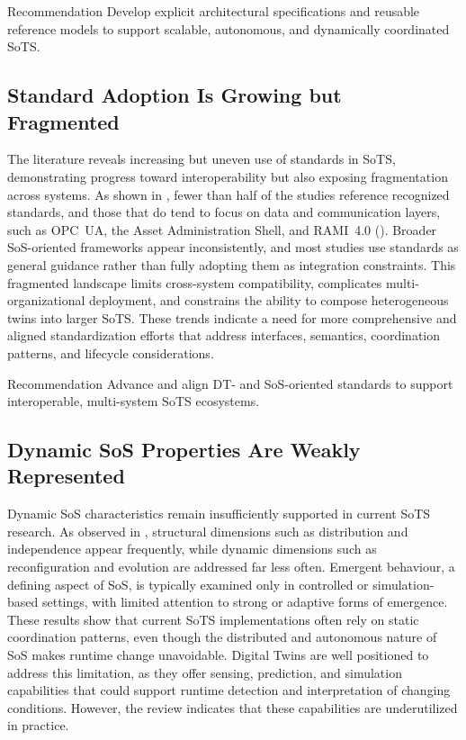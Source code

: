 \begin{recoframe}{Recommendation}
Develop explicit architectural specifications and reusable reference models to support scalable, autonomous, and dynamically coordinated SoTS.
\end{recoframe}



\subsection*{Standard Adoption Is Growing but Fragmented}

The literature reveals increasing but uneven use of standards in SoTS, demonstrating progress toward interoperability but also exposing fragmentation across systems. As shown in , fewer than half of the studies reference recognized standards, and those that do tend to focus on data and communication layers, such as OPC~UA, the Asset Administration Shell, and RAMI~4.0 (). Broader SoS-oriented frameworks appear inconsistently, and most studies use standards as general guidance rather than fully adopting them as integration constraints. This fragmented landscape limits cross-system compatibility, complicates multi-organizational deployment, and constrains the ability to compose heterogeneous twins into larger SoTS. These trends indicate a need for more comprehensive and aligned standardization efforts that address interfaces, semantics, coordination patterns, and lifecycle considerations.

\begin{recoframe}{Recommendation}
Advance and align DT- and SoS-oriented standards to support interoperable, multi-system SoTS ecosystems.
\end{recoframe}


\subsection*{Dynamic SoS Properties Are Weakly Represented}

Dynamic SoS characteristics remain insufficiently supported in current SoTS research. As observed in , structural dimensions such as distribution and independence appear frequently, while dynamic dimensions such as reconfiguration and evolution are addressed far less often. Emergent behaviour, a defining aspect of SoS, is typically examined only in controlled or simulation-based settings, with limited attention to strong or adaptive forms of emergence. These results show that current SoTS implementations often rely on static coordination patterns, even though the distributed and autonomous nature of SoS makes runtime change unavoidable. Digital Twins are well positioned to address this limitation, as they offer sensing, prediction, and simulation capabilities that could support runtime detection and interpretation of changing conditions. However, the review indicates that these capabilities are underutilized in practice.


